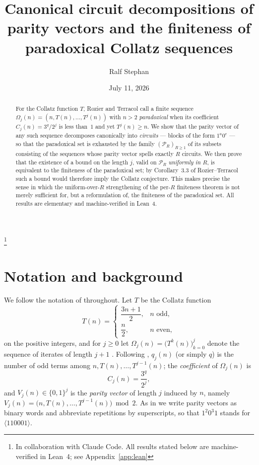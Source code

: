 \documentclass[11pt]{amsart}
\theoremstyle{plain}
\theoremstyle{definition}
\theoremstyle{remark}
\newcommand{\Par}{\mathcal{P}}        %
\newcommand{\ParR}[1]{\Par_{#1}}      %
\begin{document}
\title{Canonical circuit decompositions of parity vectors and the finiteness of paradoxical Collatz sequences}
\author{Ralf Stephan}
\thanks{In collaboration with Claude Code.  All results stated below are
machine-verified in Lean~4; see Appendix~\ref{app:lean}}
\date{July 11, 2026}

\begin{abstract}
For the Collatz function $T$, Rozier and Terracol call a finite sequence
$\Omega_j(n)=(n,T(n),\dots,T^j(n))$ with $n>2$ \emph{paradoxical} when its
coefficient $C_j(n)=3^{q}/2^{j}$ is less than~$1$ and yet $T^j(n)\ge n$.  We
show that the parity vector of any such sequence decomposes canonically into
\emph{circuits} --- blocks of the form $1^{a}0^{e}$ --- so that the paradoxical
set is exhausted by the family $(\ParR{R})_{R\ge 1}$ of its subsets consisting
of the sequences whose parity vector spells exactly $R$ circuits.  We then
prove that the existence of a bound on the length $j$, valid on $\ParR{R}$
\emph{uniformly in $R$}, is equivalent to the finiteness of the paradoxical
set; by Corollary~3.3 of Rozier--Terracol such a bound would therefore imply
the Collatz conjecture.  This makes precise the sense in which the
uniform-over-$R$ strengthening of the per-$R$ finiteness theorem is not merely
sufficient for, but a reformulation of, the finiteness of the paradoxical set.
All results are elementary and machine-verified in Lean~4.
\end{abstract}

\maketitle

\section{Notation and background}\label{sec:background}

We follow the notation of \cite{Roz25} throughout.  Let $T$ be the Collatz
function
\[
T(n)=
\begin{cases}
\dfrac{3n+1}{2}, & n \text{ odd},\\[1ex]
\dfrac{n}{2}, & n \text{ even},
\end{cases}
\]
on the positive integers, and for $j\ge 0$ let
$\Omega_j(n)=\bigl(T^k(n)\bigr)_{k=0}^{j}$ denote the sequence of iterates of
length $j+1$ \cite[Def.~4.1]{Roz25}.  Following
\cite[Def.~2.1]{Roz25}, $q_j(n)$ (or simply $q$) is the number of odd terms
among $n,T(n),\dots,T^{j-1}(n)$; the \emph{coefficient} of $\Omega_j(n)$ is
\[
C_j(n)=\frac{3^{q}}{2^{j}},
\]
and $V_j(n)\in\{0,1\}^j$ is the \emph{parity vector} of length $j$ induced by
$n$, namely $V_j(n)=\bigl(n,T(n),\dots,T^{j-1}(n)\bigr)\bmod 2$.  As in
\cite[Def.~2.1]{Roz25} we write parity vectors as binary words and abbreviate
repetitions by superscripts, so that $1^{2}0^{3}1$ stands for
$\langle 110001\rangle$.
\end{document}
